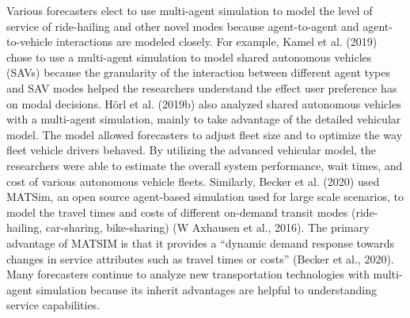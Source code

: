 \documentclass[fancy, masters]{byuthesis}
\begin{document}
Various forecasters elect to use multi-agent simulation to model the level of service of ride-hailing and other novel modes because agent-to-agent and agent-to-vehicle interactions are modeled closely. For example, Kamel et al. (2019) chose to use a multi-agent simulation to model shared autonomous vehicles (SAVs) because the granularity of the interaction between different agent types and SAV modes helped the researchers understand the effect user preference has on modal decisions. Hörl et al. (2019b) also analyzed shared autonomous vehicles with a multi-agent simulation, mainly to take advantage of the detailed vehicular model. The model allowed forecasters to adjust fleet size and to optimize the way fleet vehicle drivers behaved. By utilizing the advanced vehicular model, the researchers were able to estimate the overall system performance, wait times, and cost of various autonomous vehicle fleets. Similarly, Becker et al. (2020) used MATSim, an open source agent-based simulation used for large scale scenarios, to model the travel times and costs of different on-demand transit modes (ride-hailing, car-sharing, bike-sharing) (W Axhausen et al., 2016). The primary advantage of MATSIM is that it provides a ``dynamic demand response towards changes in service attributes such as travel times or costs'' (Becker et al., 2020). Many forecasters continue to analyze new transportation technologies with multi-agent simulation because its inherit advantages are helpful to understanding service capabilities.
\end{document}
